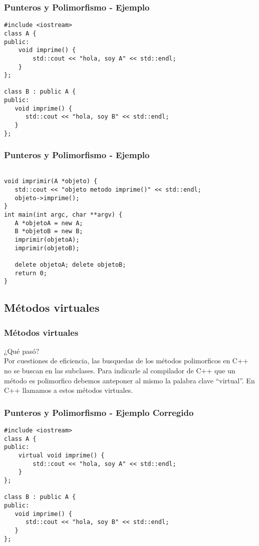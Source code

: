 \documentclass{beamer}
\begin{document}
\begin{frame}[fragile]
\frametitle{Punteros y Polimorfismo - Ejemplo}
\begin{verbatim}
#include <iostream>
class A {
public:
    void imprime() {
        std::cout << "hola, soy A" << std::endl;
    }
};

class B : public A {
public:
   void imprime() {
      std::cout << "hola, soy B" << std::endl;
   }
};

\end{verbatim}

\end{frame}

\begin{frame}[fragile]
\frametitle{Punteros y Polimorfismo - Ejemplo}
\begin{verbatim}

void imprimir(A *objeto) {
   std::cout << "objeto metodo imprime()" << std::endl;
   objeto->imprime();
} 
int main(int argc, char **argv) {
   A *objetoA = new A;
   B *objetoB = new B;
   imprimir(objetoA);
   imprimir(objetoB);

   delete objetoA; delete objetoB;
   return 0;
}
\end{verbatim}

\end{frame}

\subsection{Métodos virtuales}
\begin{frame}
\frametitle{Métodos virtuales}
¿Qué pasó? \\

Por cuestiones de eficiencia, las busquedas de los métodos polimorficos en C++ no se buscan en las subclases.
Para indicarle al compilador de C++ que un método es polimorfico debemos anteponer al mismo la palabra clave ``virtual''.
En C++ llamamos a estos métodos virtuales.

\end{frame}

\begin{frame}[fragile]
\frametitle{Punteros y Polimorfismo - Ejemplo Corregido}
\begin{verbatim}
#include <iostream>
class A {
public:
    virtual void imprime() {
        std::cout << "hola, soy A" << std::endl;
    }
};

class B : public A {
public:
   void imprime() {
      std::cout << "hola, soy B" << std::endl;
   }
};

\end{verbatim}

\end{frame}
\end{document}
